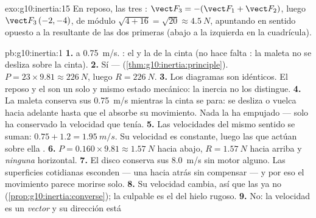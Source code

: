 \begin{solution}{exo:g10:inertia:15}
En reposo, las tres  :
$\vect F_3 = -(\vect F_1 + \vect F_2)$, luego $\vect F_3\,(-2, -4)$, de
módulo $\sqrt{4 + 16} = \sqrt{20} \approx \qty{4.5}{N}$, apuntando en
sentido opuesto a la resultante de las dos primeras (abajo a la
izquierda en la cuadrícula).
\end{solution}

\begin{solution}{pb:g10:inertia:1}
\textbf{1.}  a \qty{0.75}{m/s}. :
el  y la  de la cinta (no hace falta : la
maleta no se desliza sobre la cinta).
\textbf{2.} Sí --- 
(\cref{thm:g10:inertia:principle}). $P = 23 \times 9.81 \approx
\qty{226}{N}$, luego $R = \qty{226}{N}$.
\textbf{3.} Los diagramas son idénticos. El reposo y el  son un solo y mismo estado mecánico: la inercia no
los distingue.
\textbf{4.} La maleta conserva sus \qty{0.75}{m/s} mientras la cinta se
para: se desliza o vuelca hacia adelante hasta que el  absorbe
su movimiento. Nada la ha empujado --- solo ha conservado la velocidad
que tenía.
\textbf{5.} Las velocidades del mismo sentido se suman:
$0.75 + 1.2 = \qty{1.95}{m/s}$. Su velocidad es constante, luego las
 que actúan sobre ella .
\textbf{6.} $P = 0.160 \times 9.81 \approx \qty{1.57}{N}$ hacia abajo,
$R = \qty{1.57}{N}$ hacia arriba y \emph{ninguna}  horizontal.
\textbf{7.} El disco conserva sus \qty{8.0}{m/s} sin motor alguno. Las
superficies cotidianas esconden  --- una  hacia atrás
sin compensar --- y por eso el movimiento parece morirse solo.
\textbf{8.} Su velocidad cambia, así que las  ya no 
(\cref{prop:g10:inertia:converse}); la culpable es el  del
hielo rugoso.
\textbf{9.} No: la velocidad es un \emph{vector} y su dirección está

\end{solution}
